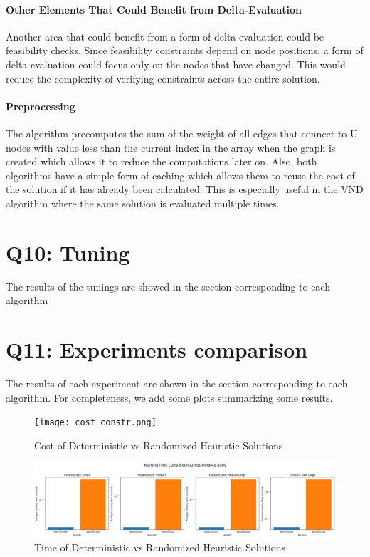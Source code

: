 \documentclass{article}
\begin{document}
\paragraph{Other Elements That Could Benefit from Delta-Evaluation}
Another area that could benefit from a form of delta-evaluation could be feasibility checks. Since feasibility constraints depend on node positions, a form of delta-evaluation could focus only on the nodes that have changed. This would reduce the complexity of verifying constraints across the entire solution.

\paragraph{Preprocessing}
The algorithm precomputes the sum of the weight of all edges that connect to U nodes with value less than the current index in the array when the graph is created which allows it to reduce the computations later on. Also, both algorithms have a simple form of caching which allows them to reuse the cost of the solution if it has already been calculated. This is especially useful in the VND algorithm where the same solution is evaluated multiple times.

\section*{Q10: Tuning}
The results of the tunings are showed in the section corresponding to each algorithm

\section*{Q11: Experiments comparison}
The results of each experiment are shown in the section corresponding to each algorithm. For completeness, we add some plots summarizing some results.

\begin{figure}[H]
	\texttt{[image: cost\_constr.png]}
	\caption{Cost of Deterministic vs Randomized Heuristic Solutions}
\end{figure}

\begin{figure}[H]
	\includegraphics[width=\linewidth]{time_constr.png}
	\caption{Time of Deterministic vs Randomized Heuristic Solutions}
\end{figure}
\end{document}
